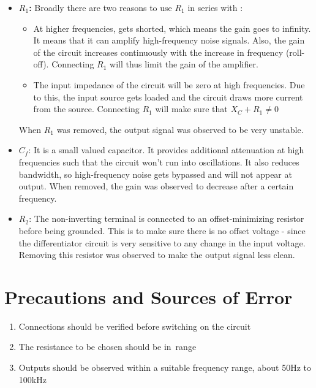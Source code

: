 \begin{itemize}
    \item \textbf{$R_1$:} Broadly there are two reasons to use $R_1$ in series with :
        \begin{itemize}
            \item At higher frequencies,  gets shorted, which means the gain goes to infinity. It means that it can amplify high-frequency noise signals. Also, the gain of the circuit increases continuously with the increase in frequency (roll-off). Connecting $R_1$ will thus limit the gain of the amplifier.
            \item The input impedance of the circuit will be zero at high frequencies. Due to this, the input source gets loaded and the circuit draws more current from the source. Connecting $R_1$ will make sure that $X_C+R_1\ne 0$
        \end{itemize}
    
    When $R_1$ was removed, the output signal was observed to be very unstable.\\
    
    \item $C_f$: It is a small valued capacitor. It provides additional attenuation at high frequencies such that the circuit won't run into oscillations. It also reduces bandwidth, so high-frequency noise gets bypassed and will not appear at output. When removed, the gain was observed to decrease after a certain frequency.\\
    \item $R_2$: The non-inverting terminal is connected to an offset-minimizing resistor before being grounded. This is to make sure there is no offset voltage - since the differentiator circuit is very sensitive to any change in the input voltage. Removing this resistor was observed to make the output signal less clean.
\end{itemize}

\section{Precautions and Sources of Error}

    \begin{enumerate}
        \item Connections should be verified before switching on the circuit
        \item The resistance to be chosen should be in \kohm\,range
        \item Outputs should be observed within a suitable frequency range, about 50Hz to 100kHz
    \end{enumerate}

